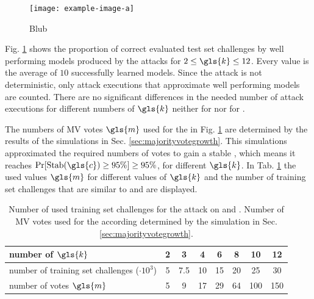 \begin{figure}[ht]
\noindent\texttt{[image: example-image-a]}
\caption[blub]{Blub}
\label{fig:cmamultiattackmodelperformance}
\end{figure}

Fig. \ref{fig:cmamultiattackmodelperformance} shows the proportion of correct evaluated test set challenges by well performing models produced by the attacks for $2 \le \gls{k} \le 12$.
Every value is the average of $10$ successfully learned models.
Since the attack is not deterministic, only attack executions that approximate well performing models are counted.
There are no significant differences in the needed number of attack executions for different numbers of $\gls{k}$ neither for \xpufs nor for \mxpufs.

The numbers of \ac{MV} votes $\gls{m}$ used for the \mxpufs in Fig. \ref{fig:cmamultiattackmodelperformance} are determined by the results of the simulations in Sec. \ref{sec:majorityvotegrowth}.
This simulations approximated the required numbers of votes to gain a stable \mxpuf, which means it reaches $\Pr[\protect\Stab(\gls{c}) \ge 95 \%] \ge 95 \%$, for different $\gls{k}$.
In Tab. \ref{tab:cmamultinumbervotes} the used values $\gls{m}$ for different values of $\gls{k}$ and the number of training set challenges that are similar to \xpufs and \mxpufs are displayed.

\begin{table}[ht]
\centering
\begin{tabular}{|l|c|c|c|c|c|c|c|}
\hline
number of $\gls{k}$ & 2 & 3 & 4 & 6 & 8 & 10 & 12\\
\hline
number of training set challenges ($\cdot 10^3$) & 5 & 7.5 & 10 & 15 & 20 & 25 & 30\\
\hline
number of votes $\gls{m}$ & 5 & 9 & 17 & 29 & 64 & 100 & 150\\
\hline
\end{tabular}
\caption[blub]{Number of used training set challenges for the attack on \xpufs and \mxpufs. Number of \ac{MV} votes used for the according \mxpufs determined by the simulation in Sec. \ref{sec:majorityvotegrowth}.}
\label{tab:cmamultinumbervotes}
\end{table}


